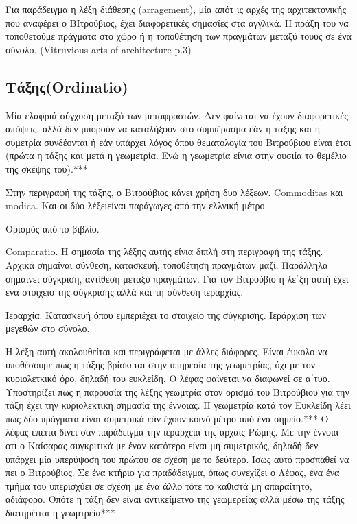   Για παράδειγμα η λέξη διάθεσης (arragement), μία απότ ις αρχές της αρχιτεκτονικής που αναφέρει ο ΒΙτρούβιος, έχει διαφορετικές σημασίες στα αγγλικά. Η πράξη του να τοποθετούμε πράγματα στο χώρο ή η τοποθέτηση των πραγμάτων μεταξύ τουυς σε ένα σύνολο. (Vitruvious arts of architecture p.3)  
  
  \subsection{Τάξης(Ordinatio)}
  
Μία ελαφριά σύγχυση μεταξύ των μεταφραστών. Δεν φαίνεται να έχουν διαφορετικές απόψεις, αλλά δεν μπορούν να καταλήξουν στο συμπέρασμα εάν η ταξης και η συμετρία συνδέονται ή εάν υπάρχει λόγος όπου θεματολογία του Βιτρούβιου είναι έτσι (πρώτα η τάξης και μετά η γεωμετρία. Ενώ η γεωμετρία είνια στην ουσιία το θεμέλιο της σκέψης του).*** \cite[σ.~187]{vitruvius-lefas}

Στην περιγραφή της τάξης, ο Βιτρούβιος κάνει χρήση δυο λέξεων. Commoditas και modica. Και οι δύο λέξειείναι παράγωγες από την ελλνική μέτρο

Ορισμός από το βιβλίο. 

Comparatio. Η σημασία της λέξης αυτής είνια διπλή στη περιγραφή της τάξης. Αρχικά σημαίναι σύνθεση, κατασκευή, τοποθέτηση πραγμάτων μαζί. Παράλληλα σημαίνει σύγκριση, αντίθεση μεταξύ πραγμάτων. Για τον Βιτρούβιο η λε΄ξη αυτή έχει ένα στοιχειο της σύγκρισης αλλά και τη σύνθεση ιεραρχίας.

Ιεραρχία. Κατασκευή όπου εμπεριέχει το στοιχείο της σύγκρισης. Ιεράρχιση των μεγεθών στο σύνολο.

Η λέξη αυτή ακολουθείται και περιγράφεται με άλλες διάφορες. Είναι έυκολο να υποθέσουμε πως η τάξης βρίσκεται στην υπηρεσία της γεωμετρίας, όχι με τον κυριολετκικό όρο, δηλαδή του ευκλείδη. Ο λέφας φαίνεται να διαφωνεί σε α΄τυο. Υποστηρίζει πως η παρουσία της λέξης γεωμτρία στον ορισμό του Βιτρούβιου για την τάξη έχει την κυριολεκτική σημασία της έννοιας. Η γεωμετρία κατά τον Ευκλείδη λέει πως δύο πράγματα είναι συμετρικά εάν έχουν κοινό μέτρο από ένα σημείο.*** Ο λέφας έπειτα δίνει σαν παράδειγμα την ιεραρχεία της αρχαίς Ρώμης. Με την έννοια οτι ο Καίσαρας συγκριτικά με έναν κατότερο είναι μη συμετρικός,  δηλαδή δεν υπάρχει μία υπερύψοση του πρώτου σε σχέση με το δεύτερο. Ίσως αυτό προσπαθεί να πει ο Βιτρούβιος. Σε ένα κτήριο για πραδάδειγμα, όπως συνεχίζει ο Λέφας, ένα ένα τμήμα του υπερισχύει σε σχέση με ένα άλλο τότε το καθιστά μη απαραίτητο, αδιάφορο. Οπότε η τάξη δεν είναι αντικείμετνο της γεωμερείας αλλά μέσω της τάξης διατηρέιται η γεωμτρεία*** 

